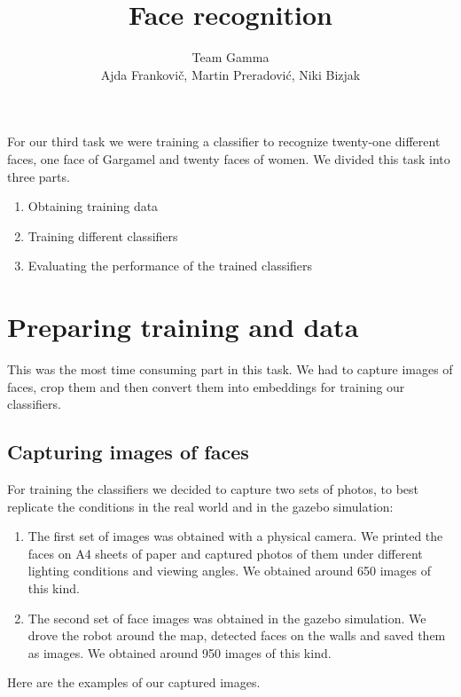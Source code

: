 \documentclass[12pt,a4paper]{article}
\author{Team Gamma \\ {\small Ajda Frankovič, Martin Preradović, Niki Bizjak}}
\title{Face recognition}
\date{}
\begin{document}
    \maketitle

    For our third task we were training a classifier to recognize twenty-one different faces, one face of Gargamel and twenty faces of women. We divided this task into three parts.

    \begin{enumerate}
      \item Obtaining training data
      \item Training different classifiers
      \item Evaluating the performance of the trained classifiers
    \end{enumerate}

    \section{Preparing training and data}

    This was the most time consuming part in this task. We had to capture images of faces, crop them and then convert them into embeddings for training our classifiers.

    \subsection{Capturing images of faces}

    For training the classifiers we decided to capture two sets of photos, to best replicate the conditions in the real world and in the gazebo simulation:

    \begin{enumerate}
      \item The first set of images was obtained with a physical camera. We printed the faces on A4 sheets of paper and captured photos of them under different lighting conditions and viewing angles. We obtained around 650 images of this kind.
      \item The second set of face images was obtained in the gazebo simulation. We drove the robot around the map, detected faces on the walls and saved them as images. We obtained around 950 images of this kind.
    \end{enumerate}    

    Here are the examples of our captured images.
\end{document}
